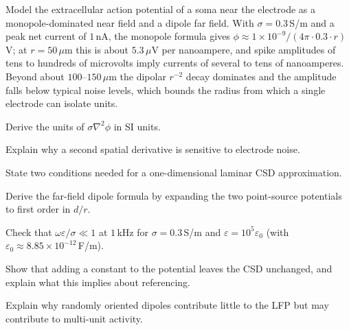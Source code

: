\begin{workedexample}
Model the extracellular action potential of a soma near the electrode as a monopole-dominated near field and a dipole far field. With $\sigma=0.3$\,S/m and a peak net current of $1$\,nA, the monopole formula gives $\phi\approx1\times10^{-9}/(4\pi\cdot0.3\cdot r)$\,V; at $r=50\,\mu$m this is about $5.3\,\mu$V per nanoampere, and spike amplitudes of tens to hundreds of microvolts imply currents of several to tens of nanoamperes. Beyond about $100$--$150\,\mu$m the dipolar $r^{-2}$ decay dominates and the amplitude falls below typical noise levels, which bounds the radius from which a single electrode can isolate units.
\end{workedexample}
\begin{exercises}
\item Derive the units of $\sigma\nabla^2\phi$ in SI units.
\item Explain why a second spatial derivative is sensitive to electrode noise.
\item State two conditions needed for a one-dimensional laminar CSD approximation.
\item Derive the far-field dipole formula by expanding the two point-source potentials to first order in $d/r$.
\item Check that $\omega\varepsilon/\sigma\ll1$ at $1$\,kHz for $\sigma=0.3$\,S/m and $\varepsilon=10^{5}\varepsilon_0$ (with $\varepsilon_0\approx8.85\times10^{-12}$\,F/m).
\item Show that adding a constant to the potential leaves the CSD unchanged, and explain what this implies about referencing.
\item Explain why randomly oriented dipoles contribute little to the LFP but may contribute to multi-unit activity.
\end{exercises}
